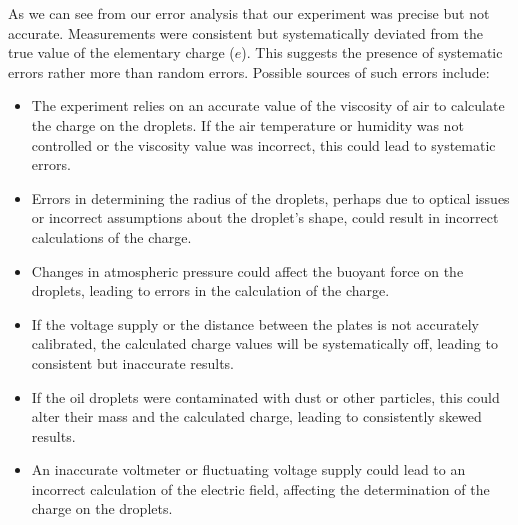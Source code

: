 As we can see from our error analysis that our experiment
was precise but not accurate. Measurements were consistent but systematically deviated from the true value
of the elementary charge ($e$). This suggests the presence
of systematic errors rather more than random errors. Possible
sources of such errors include:\\

\begin{itemize}
    \item The experiment relies on an accurate value of the viscosity of air to calculate the charge on the droplets.
    If the air temperature or humidity was not controlled
    or the viscosity value was incorrect, this could lead
    to systematic errors.
    \item Errors in determining the radius of the droplets, perhaps due to optical issues or incorrect assumptions
    about the droplet’s shape, could result in incorrect
    calculations of the charge.
    \item Changes in atmospheric pressure could affect the
    buoyant force on the droplets, leading to errors in
    the calculation of the charge.
    \item If the voltage supply or the distance between the
    plates is not accurately calibrated, the calculated
    charge values will be systematically off, leading to
    consistent but inaccurate results.
    \item If the oil droplets were contaminated with dust or
    other particles, this could alter their mass and the
    calculated charge, leading to consistently skewed results.
    \item An inaccurate voltmeter or fluctuating voltage supply could lead to an incorrect calculation of the electric field, affecting the determination of the charge
    on the droplets.
\end{itemize}